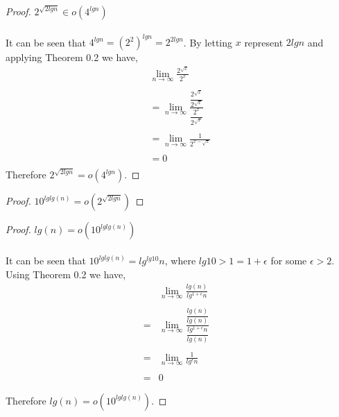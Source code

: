 \documentclass[12pt]{article}
\newenvironment{question}[2][Question]{\begin{trivlist}
\item[\hskip \labelsep {\bfseries #1}\hskip \labelsep {\bfseries #2.}]}{\end{trivlist}}
\begin{document}
\begin{question}{4}
  \begin{proof} $2^{\sqrt{2lgn}} \in o(4^{lgn})$
    \leavevmode \\ \\
    It can be seen that $4^{lgn} = (2^{2})^{lgn} = 2^{2lgn}$.
    By letting $x$ represent $2lgn$ and applying Theorem 0.2 we have,
    \begin{align*}
      &\lim_{n\to\infty} \frac{
        2^{\sqrt{x}}
      }{
        2^{x}
      }&\\ \\
      & = \lim_{n\to\infty} \frac{
        \dfrac{
          2^{\sqrt{x}}
        }{
          2^{\sqrt{x}}
        }
      }{
        \dfrac{
          2^{x}
        }{
          2^{\sqrt{x}}
        }
      }&\\ \\
      & = \lim_{n\to\infty} \frac{1}{
        2^{x - \sqrt{x}}
      }&\\ \\
      & = 0&\\
    \end{align*}
    Therefore $2^{\sqrt{2lgn}} = o(4^{lgn})$.
  \end{proof}
  
  \begin{proof} $10^{lglg(n)} = o(2^{\sqrt{2lgn}})$
  \end{proof}

  \begin{proof} $lg(n) = o(10^{lglg(n)})$
    \leavevmode \\ \\
    It can be seen that $10^{lglg(n)} = lg^{lg10}n$, where $lg10 > 1 = 1 + \epsilon$ for some $\epsilon > 2$.
    Using Theorem 0.2 we have,
    \begin{align*}
      &\lim_{n\to\infty} \frac{
        lg(n)
      }{
        lg^{1 + \epsilon}n
      }&\\ \\
      = & \lim_{n\to\infty} \frac{
        \dfrac{lg(n)}{lg(n)}
      }{
        \dfrac{lg^{1 + \epsilon}n}{lg(n)}
      }&\\ \\
      = & \lim_{n\to\infty} \frac{
        1
      }{
        lg^{\epsilon}n
      }&\\ \\
      = & 0 &
    \end{align*}

    Therefore $lg(n) = o(10^{lglg(n)})$.
  \end{proof}


\end{question}
\end{document}
